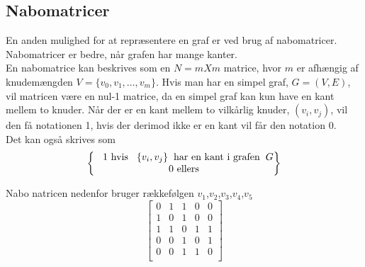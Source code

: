 \subsection{Nabomatricer}
En anden mulighed for at repræsentere en graf er ved brug af nabomatricer. Nabomatricer er bedre, når grafen har mange kanter.\\
En nabomatrice kan beskrives som en $N=m X m$ matrice, hvor $m$ er afhængig af knudemængden $V=\{v_0, v_1, \ldots, v_m\}$. Hvis man har en simpel graf, $G=(V,E)$, vil matricen være en nul-1 matrice, da en simpel graf kan kun have en kant mellem to knuder. Når der er en kant mellem to  vilkårlig knuder, $(v_i,v_j)$,  vil den få notationen 1, hvis der derimod ikke er en kant vil får den notation 0. \\

Det kan også skrives som \\

\begin{equation}
\begin{Bmatrix} 
	 \hspace{0.3cm}\textrm{1 hvis} \hspace{0.3cm}\{v_i,v_j\} \hspace{0.2cm} \textrm{har en kant i grafen} \hspace{0.2cm} G \\
	 \textrm{0 ellers} \\
	\end{Bmatrix}
\end{equation}



\begin{figure}[H]
  \centering
  \label{fig:simpelgraf}
\end{figure}

Nabo natricen nedenfor bruger rækkefølgen $v_1$,$v_2$,$v_3$,$v_4$,$v_5$
\begin{equation}
	\begin{bmatrix}
		0&1&1&0&0 \\
		1&0&1&0&0 \\
		1&1&0&1&1 \\
		0&0&1&0&1 \\
		0&0&1&1&0 \\
	\end{bmatrix}
\end{equation}

	


